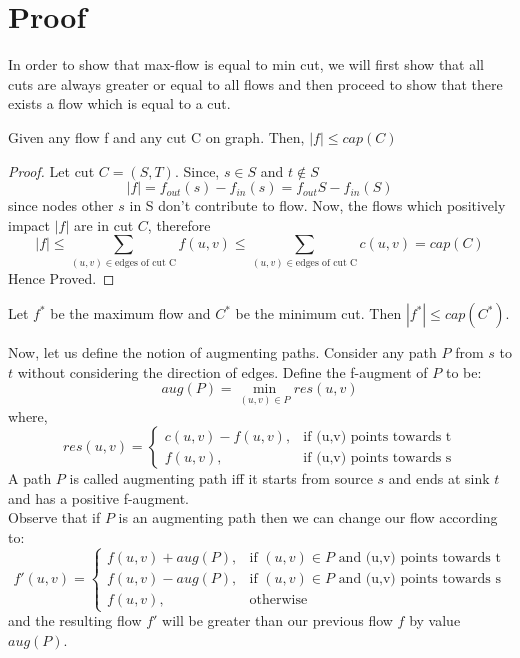 \documentclass[11pt,a4paper]{article}
\begin{document}
\section{Proof}
    In order to show that max-flow is equal to min cut, we will first show that all cuts are always greater or equal to all
    flows and then proceed to show that there exists a flow which is equal to a cut.\\
    \begin{lm}\label{lm:greater} Given any flow f and any cut C on graph. Then, $|f| \leq cap(C)$\end{lm}
    \begin{proof} Let cut $C = (S,T)$. Since, $s \in S$ and $t \notin S$\\
    $$|f| = f_{out}(s) - f_{in}(s) = f_{out}{S} - f_{in}(S)$$
    since nodes other $s$ in S don't contribute to flow. Now, the flows which positively impact $|f|$ are in cut $C$, therefore
    $$|f| \leq \sum_{(u,v)\in\text{edges of cut C}}f(u,v) \leq \sum_{(u,v)\in\text{edges of cut C}}c(u,v) = cap(C)$$
    Hence Proved.
    \end{proof}
    \begin{cor}\label{cor:greater} Let $f^*$ be the maximum flow and $C^*$ be the minimum cut. Then $|f^*| \leq cap(C^*)$.
    \end{cor}
    Now, let us define the notion of augmenting paths. Consider any path $P$ from $s$ to $t$ without considering the direction
    of edges. Define the f-augment of $P$ to be:
    $$aug(P) = \min_{(u,v)\in P} res(u,v)$$
    where,
    $$res(u,v) = \begin{cases} c(u,v) - f(u,v), &\text{if (u,v) points towards t}\\
    f(u,v), &\text{if (u,v) points towards s} \end{cases}$$
    A path $P$ is called augmenting path iff it starts from source $s$ and ends at sink $t$ and has a positive f-augment.\\
    Observe that if $P$ is an augmenting path then we can change our flow according to:
    $$ f'(u,v) = \begin{cases} f(u,v)+aug(P), &\text{if }(u,v)\in P\text{ and (u,v) points towards t}\\
                                f(u,v)-aug(P), &\text{if }(u,v)\in P\text{ and (u,v) points towards s}\\
                                f(u,v),&\text{otherwise}
    \end{cases}$$
    and the resulting flow $f'$ will be greater than our previous flow $f$ by value $aug(P)$.
\end{document}
